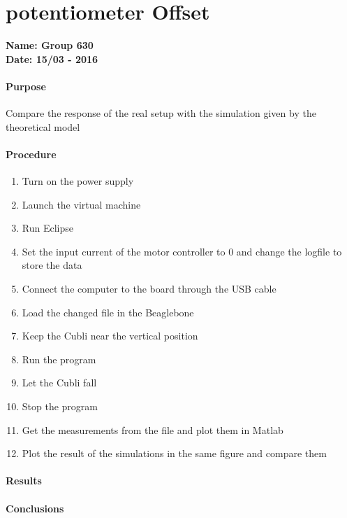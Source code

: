 \chapter{potentiometer Offset}\label{potentiometerOffset} 
\textbf{Name: Group 630}\\
\textbf{Date: 15/03 - 2016}

\subsubsection{Purpose}
Compare the response of the real setup with the simulation given by the theoretical model

\subsubsection{Procedure}
\begin{enumerate}
	\item Turn on the power supply
	\item Launch the virtual machine
	\item Run Eclipse
	\item Set the input current of the motor controller to 0 and change the logfile to store the data
	\item Connect the computer to the board through the USB cable
	\item Load the changed file in the Beaglebone
	\item Keep the Cubli near the vertical position
	\item Run the program
	\item Let the Cubli fall
	\item Stop the program
	\item Get the measurements from the file and plot them in Matlab
	\item Plot the result of the simulations in the same figure and compare them

\end{enumerate}

\subsubsection{Results}

\subsubsection{Conclusions}

